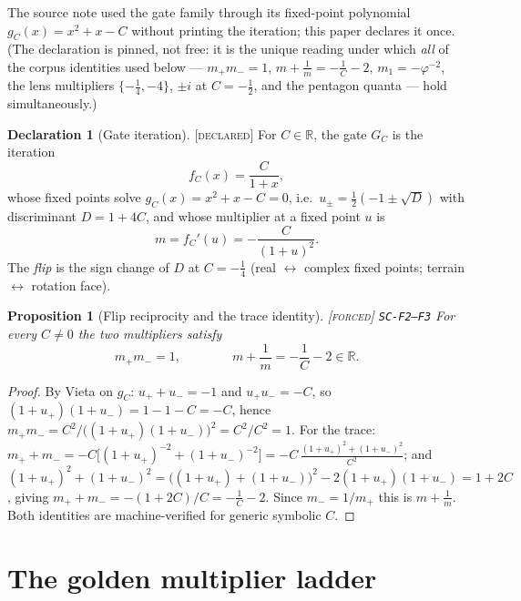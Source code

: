 \documentclass[11pt]{article}
\newcommand{\tagF}{\textcolor{cF}{\textsc{[forced]}}}
\newcommand{\tagD}{\textcolor{cD}{\textsc{[declared]}}}
\newcommand{\hx}[1]{\textcolor{cC}{\footnotesize\texttt{#1}}}
\newcommand{\R}{\mathbb{R}}
\newcommand{\gp}{\varphi}
\theoremstyle{plain}
\newtheorem{proposition}[theorem]{Proposition}
\theoremstyle{definition}
\newtheorem{declaration}[theorem]{Declaration}
\theoremstyle{remark}
\begin{document}
The source note used the gate family through its fixed-point polynomial
$g_C(x)=x^2+x-C$ without printing the iteration; this paper declares it once. (The
declaration is pinned, not free: it is the unique reading under which \emph{all} of
the corpus identities used below --- $m_+m_-=1$, $m+\tfrac1m=-\tfrac1C-2$,
$m_1=-\gp^{-2}$, the lens multipliers $\{-\tfrac14,-4\}$, $\pm i$ at $C=-\tfrac12$,
and the pentagon quanta --- hold simultaneously.)

\begin{declaration}[Gate iteration]\label{dec:gate}\tagD{}
For $C\in\R$, the gate $G_C$ is the iteration
\[
f_C(x)=\frac{C}{1+x},
\]
whose fixed points solve $g_C(x)=x^2+x-C=0$, i.e.\
$u_\pm=\tfrac12(-1\pm\sqrt D)$ with discriminant $D=1+4C$, and whose multiplier at a
fixed point $u$ is
\[
m=f_C'(u)=-\frac{C}{(1+u)^2}.
\]
The \emph{flip} is the sign change of $D$ at $C=-\tfrac14$ (real
$\leftrightarrow$ complex fixed points; terrain $\leftrightarrow$ rotation face).
\end{declaration}

\begin{proposition}[Flip reciprocity and the trace identity]\label{prop:reciprocity}\tagF{} \hx{SC-F2--F3}
For every $C\neq0$ the two multipliers satisfy
\[
m_+m_-=1,\qquad\qquad m+\frac1m=-\frac1C-2\in\R .
\]
\end{proposition}

\begin{proof}
By Vieta on $g_C$: $u_++u_-=-1$ and $u_+u_-=-C$, so
$(1+u_+)(1+u_-)=1-1-C=-C$, hence
$m_+m_-=C^2/\bigl((1+u_+)(1+u_-)\bigr)^2=C^2/C^2=1$. For the trace:
$m_++m_-=-C\bigl[(1+u_+)^{-2}+(1+u_-)^{-2}\bigr]
=-C\,\frac{(1+u_+)^2+(1+u_-)^2}{C^2}$; and
$(1+u_+)^2+(1+u_-)^2=\bigl((1+u_+)+(1+u_-)\bigr)^2-2(1+u_+)(1+u_-)=1+2C$, giving
$m_++m_-=-(1+2C)/C=-\tfrac1C-2$. Since $m_-=1/m_+$ this is $m+\tfrac1m$. Both
identities are machine-verified for generic symbolic $C$.
\end{proof}

\section{The golden multiplier ladder}\label{sec:ladder}
\end{document}
